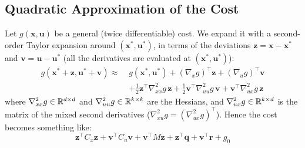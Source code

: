 \documentclass[10pt, a4paper]{report}
\begin{document}
\subsection{Quadratic Approximation of the Cost}
Let $g(\mathbf x,\mathbf u)$ be a general (twice differentiable) cost. We expand it with a second-order Taylor expansion around $(\mathbf x^*,\mathbf u^*)$, in terms of the deviations $\mathbf z=\mathbf x-\mathbf x^*$ and $\mathbf v=\mathbf u-\mathbf u^*$ (all the derivatives are evaluated at $(\mathbf x^*,\mathbf u^*)$):\begin{align}
    g(\mathbf x^*+\mathbf z,\mathbf u^*+\mathbf v)\approx\;& g(\mathbf x^*,\mathbf u^*)+(\nabla_x g)^\top\mathbf z+(\nabla_u g)^\top\mathbf v\nonumber\\
    &+\tfrac12\mathbf z^\top\nabla_{xx}^2 g\,\mathbf z+\tfrac12\mathbf v^\top\nabla_{uu}^2 g\,\mathbf v+\mathbf v^\top\nabla_{ux}^2 g\,\mathbf z
\end{align}
where $\nabla_{xx}^2g\in{\mathbb R}^{d\times d}$ and $\nabla_{uu}^2g\in{\mathbb R}^{k\times k}$ are the Hessians, and $\nabla_{ux}^2g\in{\mathbb R}^{k\times d}$ is the matrix of the mixed second derivatives ($\nabla_{xu}^2g=(\nabla_{ux}^2g)^\top$). Hence the cost becomes something like:\begin{equation}\label{LQ_cost}
    \mathbf z^\top C_x\mathbf z+\mathbf v^\top C_u\mathbf v+\mathbf v^\top M\mathbf z+\mathbf z^\top\mathbf q+\mathbf v^\top\mathbf r+g_0
\end{equation}
\end{document}
